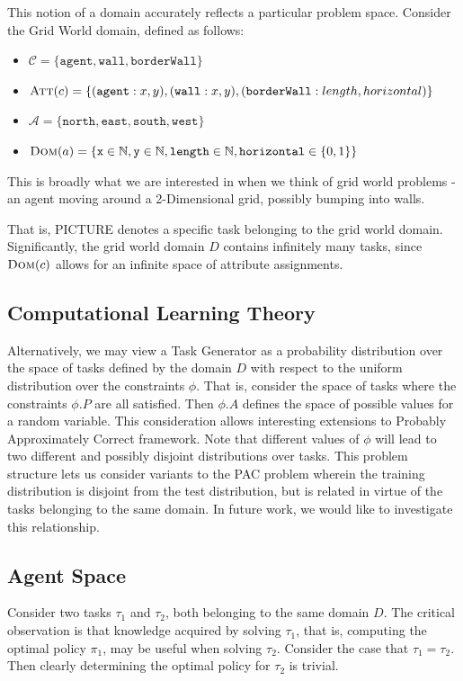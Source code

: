 \documentclass[11pt]{article}
\begin{document}
This notion of a domain accurately reflects a particular problem space. Consider the Grid World domain, defined as follows:
\begin{itemize}
\item $\mathcal{C} = \{\texttt{agent}, \texttt{wall}, \texttt{borderWall}\}$
\item $\textsc{Att}(c) = \{(\texttt{agent} : x, y), (\texttt{wall} : x, y), (\texttt{borderWall} : length, horizontal)\}$
\item $\mathcal{A} = \{\texttt{north}, \texttt{east}, \texttt{south}, \texttt{west}\}$
\item $\textsc{Dom}(a) = \{\texttt{x} \in \mathbb{N}, \texttt{y} \in \mathbb{N},  \texttt{length} \in \mathbb{N}, \texttt{horizontal} \in \{0,1\}\}$
\end{itemize}

This is broadly what we are interested in when we think of grid world problems - an agent moving around a 2-Dimensional grid, possibly bumping into walls.

That is, PICTURE denotes a specific task belonging to the grid world domain. Significantly, the grid world domain $D$ contains infinitely many tasks, since $\textsc{Dom}(c)$ allows for an infinite space of attribute assignments.



\subsection{Computational Learning Theory}
Alternatively, we may view a Task Generator as a probability distribution over the space of tasks defined by the domain $D$ with respect to the uniform distribution over the constraints $\phi$. That is, consider the space of tasks where the constraints $\phi.P$ are all satisfied. Then $\phi.A$ defines the space of possible values for a random variable. This consideration allows interesting extensions to Probably Approximately Correct framework. Note that different values of $\phi$ will lead to two different and possibly disjoint distributions over tasks. This problem structure lets us consider variants to the PAC problem wherein the training distribution is disjoint from the test distribution, but is related in virtue of the tasks belonging to the same domain. In future work, we would like to investigate this relationship.


\subsection{Agent Space}
Consider two tasks $\tau_1$ and $\tau_2$, both belonging to the same domain $D$. The critical observation is that knowledge acquired by solving $\tau_1$, that is, computing the optimal policy $\pi_1$, may be useful when solving $\tau_2$. Consider the case that $\tau_1 = \tau_2$. Then clearly determining the optimal policy for $\tau_2$ is trivial.
\end{document}
